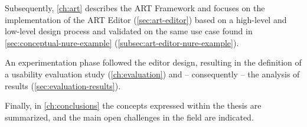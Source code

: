 Subsequently, \autoref{ch:art} describes the ART Framework and focuses on the implementation of the ART Editor (\autoref{sec:art-editor}) based on a high-level and low-level design process and validated on the same use case found in \autoref{sec:conceptual-nure-example} (\autoref{subsec:art-editor-nure-example}). 

An experimentation phase followed the editor design, resulting in the definition of a usability evaluation study (\autoref{ch:evaluation}) and -- consequently -- the analysis of results (\autoref{sec:evaluation-results}).

Finally, in \autoref{ch:conclusions} the concepts expressed within the thesis are summarized, and the main open challenges in the field are indicated.
